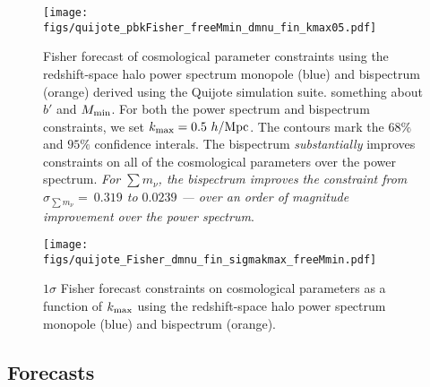 \documentclass[12pt, letterpaper, preprint]{aastex62}
\newcommand{\smnu}{\sum m_\nu}
\newcommand{\ch}[1]{{\color{orange}{\bf CH:} #1}}
\begin{document}
\begin{figure}
\begin{center}
    \texttt{[image: figs/quijote\_pbkFisher\_freeMmin\_dmnu\_fin\_kmax05.pdf]}
    \caption{Fisher forecast of cosmological parameter constraints using the 
    redshift-space halo power spectrum monopole (blue) and bispectrum (orange) 
    derived using the Quijote simulation suite. \ch{something about $b'$ and $M_{\rm min}$}.
    For both the power spectrum 
    and bispectrum constraints, we set $k_{\rm max} = 0.5~h/{\rm Mpc}$. The 
    contours mark the $68\%$ and $95\%$ confidence interals. The bispectrum 
    {\em substantially} improves constraints on all of the cosmological parameters 
    over the power spectrum. {\em For $\smnu$, the bispectrum improves the constraint
    from $\sigma_{\smnu}{=}~0.319$ to $0.0239$ --- over an order of magnitude 
    improvement over the power spectrum}.}
\label{fig:bk_fish}
\end{center}
\end{figure}

\begin{figure}
\begin{center}
    \texttt{[image: figs/quijote\_Fisher\_dmnu\_fin\_sigmakmax\_freeMmin.pdf]} 
    \caption{$1\sigma$ Fisher forecast constraints on cosmological parameters as a function
    of $k_{\rm max}$ using the redshift-space halo power spectrum monopole (blue) and 
    bispectrum (orange). }
\label{fig:pk_fish_kmax}
\end{center}
\end{figure}

\subsection{Forecasts} \label{sec:forecasts}
\end{document}
